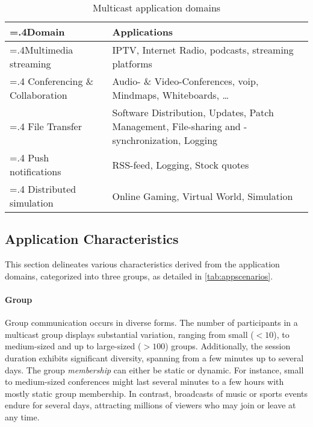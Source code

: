 
\begin{table}[h]
    \centering
    \begin{tabularx}{\textwidth}{>{\hsize=.4\hsize}XX}
    \toprule
        \textbf{Domain} & \textbf{Applications} \\
    \midrule
        Multimedia streaming &
        IPTV, Internet Radio, podcasts, streaming platforms
        \\\addlinespace
        Conferencing \& Collaboration &
        Audio- \& Video-Conferences, \gls{voip}, Mindmaps, Whiteboards, \dots
        \\\addlinespace
        File Transfer &
        Software Distribution, Updates, Patch Management, File-sharing and
            -synchronization, Logging
        \\\addlinespace
        Push notifications &
        RSS-feed, Logging, Stock quotes
        \\\addlinespace
        Distributed simulation &
        Online Gaming, Virtual World, Simulation \\

    \bottomrule
    \end{tabularx}
    \caption{Multicast application domains}
    \label{tab:mcappdom}
\end{table}

\subsection{Application Characteristics} %
\label{sub:Application Characteristics}
This section delineates various characteristics derived from the application
    domains, categorized into three groups, as detailed in
    \autoref{tab:appscenarios}.
\paragraph{Group} %
\label{par:Group}
Group communication occurs in diverse forms.
The number of participants in a multicast group displays substantial variation,
    ranging from small ($<10$), to medium-sized and up to large-sized ($>100$)
    groups.
Additionally, the session duration exhibits significant diversity, spanning
    from a few minutes up to several days.
The group \textit{membership} can either be static or dynamic.
For instance, small to medium-sized conferences might last several minutes
    to a few hours with mostly static group membership.
In contrast, broadcasts of music or sports events endure for several days,
    attracting millions of viewers who may join or leave at any time.

